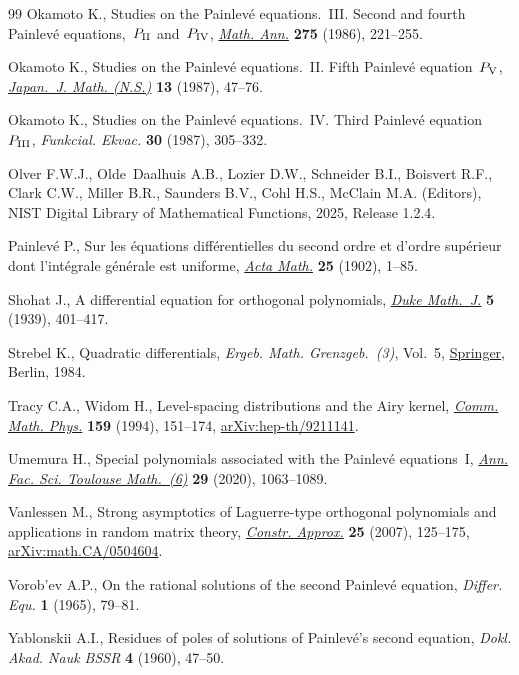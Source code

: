 \documentclass[10pt,a4paper]{amsart}
\numberwithin{equation}{section}
\theoremstyle{definition}
\begin{document}
\begin{thebibliography}{99}
Okamoto K., Studies on the {P}ainlev\'e equations.~{III}. {S}econd and fourth
 {P}ainlev\'e equations,~{$P_{{\rm II}}$} and~{$P_{{\rm IV}}$},
 \href{https://doi.org/10.1007/BF01458459}{\textit{Math. Ann.}} \textbf{275}
 (1986), 221--255.

Okamoto K., Studies on the {P}ainlev\'e equations.~{II}. {F}ifth {P}ainlev\'e
 equation~{$P_{\rm V}$},
 \href{https://doi.org/10.4099/math1924.13.47}{\textit{Japan.~J. Math.
 (N.S.)}} \textbf{13} (1987), 47--76.

Okamoto K., Studies on the {P}ainlev\'e equations.~{IV}. {T}hird {P}ainlev\'e
 equation~{$P_{{\rm III}}$}, \textit{Funkcial. Ekvac.} \textbf{30} (1987),
 305--332.

Olver F.W.J., Olde~Daalhuis A.B., Lozier D.W., Schneider B.I., Boisvert R.F.,
 Clark C.W., Miller B.R., Saunders B.V., Cohl H.S., McClain M.A. (Editors),
 NIST Digital Library of Mathematical Functions, 2025, Release 1.2.4.

Painlev\'e P., Sur les \'equations diff\'erentielles du second ordre et d'ordre
 sup\'erieur dont l'int\'egrale g\'en\'erale est uniforme,
 \href{https://doi.org/10.1007/BF02419020}{\textit{Acta Math.}} \textbf{25}
 (1902), 1--85.

Shohat J., A differential equation for orthogonal polynomials,
 \href{https://doi.org/10.1215/S0012-7094-39-00534-X}{\textit{Duke Math.~J.}}
 \textbf{5} (1939), 401--417.

Strebel K., Quadratic differentials, \textit{Ergeb. Math. Grenzgeb.~(3)},
 Vol.~5, \href{https://doi.org/10.1007/978-3-662-02414-0}{Springer}, Berlin,
 1984.

Tracy C.A., Widom H., Level-spacing distributions and the {A}iry kernel,
 \href{https://doi.org/10.1007/BF02100489}{\textit{Comm. Math. Phys.}}
 \textbf{159} (1994), 151--174,
 \href{http://arxiv.org/abs/hep-th/9211141}{arXiv:hep-th/9211141}.

Umemura H., Special polynomials associated with the {P}ainlev\'e equations~{I},
 \href{https://doi.org/10.5802/afst.1657}{\textit{Ann. Fac. Sci. Toulouse
 Math.~(6)}} \textbf{29} (2020), 1063--1089.

Vanlessen M., Strong asymptotics of {L}aguerre-type orthogonal polynomials and
 applications in random matrix theory,
 \href{https://doi.org/10.1007/s00365-005-0611-z}{\textit{Constr. Approx.}}
 \textbf{25} (2007), 125--175,
 \href{http://arxiv.org/abs/math.CA/0504604}{arXiv:math.CA/0504604}.

Vorob'ev A.P., On the rational solutions of the second {P}ainlev\'e equation,
 \textit{Differ. Equ.} \textbf{1} (1965), 79--81.

Yablonskii A.I., Residues of poles of solutions of Painlev\'e's second
 equation, \textit{Dokl. Akad. Nauk BSSR} \textbf{4} (1960), 47--50.

\end{thebibliography}
\end{document}
